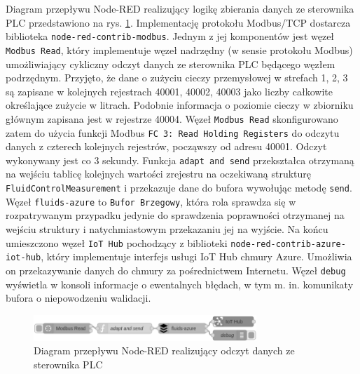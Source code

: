 \documentclass[a4paper, 12pt, twoside]{article}
\begin{document}
Diagram przepływu Node-RED realizujący logikę zbierania danych ze sterownika
PLC przedstawiono na rys. \ref{fig:flow3}. Implementację protokołu
Modbus/TCP dostarcza biblioteka \texttt{node-red-contrib-modbus}. 
Jednym z jej komponentów jest węzeł \texttt{Modbus Read}, który implementuje
węzeł nadrzędny (w sensie protokołu Modbus) umożliwiający cykliczny odczyt 
danych ze sterownika PLC będącego węzłem podrzędnym. Przyjęto, że dane
o zużyciu cieczy przemysłowej w strefach 1, 2, 3 są zapisane w kolejnych rejestrach
40001, 40002, 40003 jako liczby całkowite określające zużycie w litrach. 
Podobnie informacja o poziomie cieczy w zbiorniku głównym zapisana jest w rejestrze 40004.
Węzeł \texttt{Modbus Read} skonfigurowano zatem do użycia funkcji Modbus
\texttt{FC 3: Read Holding Registers} do odczytu danych z czterech kolejnych
rejestrów, począwszy od adresu 40001. Odczyt wykonywany jest co 3 sekundy.
Funkcja \texttt{adapt and send} przekształca otrzymaną na wejściu tablicę
kolejnych wartości zrejestru na oczekiwaną strukturę \texttt{FluidControlMeasurement}
i przekazuje dane do bufora wywołując metodę \texttt{send}.
Węzeł \texttt{fluids-azure} to \texttt{Bufor Brzegowy}, która rola sprawdza się 
w rozpatrywanym przypadku jedynie do sprawdzenia poprawności otrzymanej na 
wejściu struktury i natychmiastowym przekazaniu jej na wyjście. Na końcu
umieszczono węzeł \texttt{IoT Hub} pochodzący z biblioteki \texttt{node-red-contrib-azure-iot-hub},
który implementuje interfejs usługi IoT Hub chmury Azure. Umożliwia on przekazywanie
danych do chmury za pośrednictwem Internetu.
Węzeł \texttt{debug} wyświetla w konsoli informacje o ewentalnych błędach, w 
tym m. in. komunikaty bufora o niepowodzeniu walidacji. 

\begin{figure}[h]
      \centering
      \includegraphics[width=0.75\textwidth]{flow3.png}
      \caption{Diagram przepływu Node-RED realizujący odczyt danych ze sterownika PLC}
      \label{fig:flow3}
\end{figure}
\end{document}
